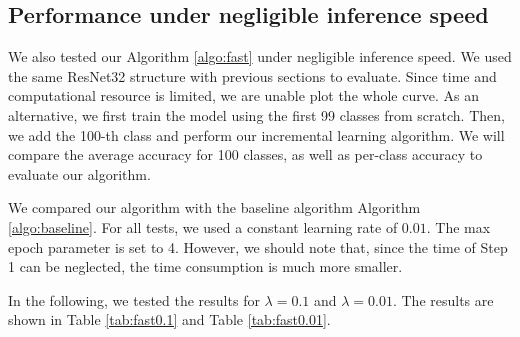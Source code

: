 \subsection{Performance under negligible inference speed}
We also tested our Algorithm \ref{algo:fast} under negligible inference speed. We used the same ResNet32 structure with previous sections to evaluate. Since time and computational resource is limited, we are unable plot the whole curve. As an alternative, we first train the model using the first 99 classes from scratch. Then, we add the 100-th class and perform our incremental learning algorithm. We will compare the average accuracy for 100 classes, as well as per-class accuracy to evaluate our algorithm.

We compared our algorithm with the baseline algorithm Algorithm \ref{algo:baseline}. For all tests, we used a constant learning rate of $0.01$. The max epoch parameter is set to 4. However, we should note that, since the time of Step 1 can be neglected, the time consumption is much more smaller. 

In the following, we tested the results for $\lambda=0.1$ and $\lambda=0.01$. The results are shown in Table \ref{tab:fast0.1} and Table \ref{tab:fast0.01}.

